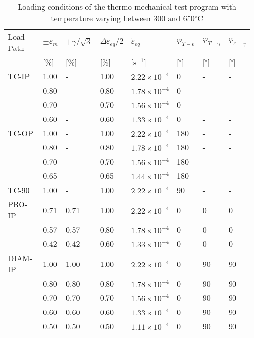 \documentclass[preprint,5p,twocolumn,11pt,sort&compress]{elsarticle}
\begin{document}
\begin{table*}[htbp]
  \centering
  \caption{Loading conditions of the thermo-mechanical test program with temperature varying between 300 and 650$^\circ$C} \vspace{0.1cm}
    \begin{tabular}{p{2cm}p{1.5cm}p{1.5cm}p{1.5cm}p{2.5cm}p{1cm}p{1cm}p{1cm}}
    \hline
    Load Path & $\pm \varepsilon _m$ & $\pm \gamma/ \sqrt 3$ & $\Delta\varepsilon _{eq}/2$ & $\dot \varepsilon _{eq}$ & $\varphi_{T-\varepsilon}$ & $\varphi_{T-\gamma}$ & $\varphi_{\varepsilon-\gamma}$ \\
          & [\%]  & [\%]  & [\%]  & [s$^{-1}$] & [$^\circ$] & [$^\circ$] & [$^\circ$]  \\
    \hline
    TC-IP & 1.00  & -     & 1.00  & $2.22\times 10^{-4}$ & 0     & -     & -   \\
          & 0.80  & -     & 0.80  & $1.78\times 10^{-4}$ & 0     & -     & -    \\
          & 0.70  & -     & 0.70  & $1.56\times 10^{-4}$ & 0     & -     & -    \\
          & 0.60  & -     & 0.60  & $1.33\times 10^{-4}$ & 0     & -     & -     \\
    \hline
    TC-OP & 1.00  & -     & 1.00  & $2.22\times 10^{-4}$ & 180   & -     & -    \\
          & 0.80  & -     & 0.80  & $1.78\times 10^{-4}$ & 180   & -     & -    \\
          & 0.70  & -     & 0.70  & $1.56\times 10^{-4}$ & 180   & -     & -    \\
          & 0.65  & -     & 0.65  & $1.44\times 10^{-4}$ & 180   & -     & -    \\
    \hline
    TC-90 & 1.00  & -     & 1.00  & $2.22\times 10^{-4}$ & 90    & -     & -    \\
    \hline
    PRO-IP & 0.71  & 0.71  & 1.00  & $2.22\times 10^{-4}$ & 0     & 0     & 0    \\
          & 0.57  & 0.57  & 0.80  & $1.78\times 10^{-4}$ & 0     & 0     & 0    \\
          & 0.42  & 0.42  & 0.60  & $1.33\times 10^{-4}$ & 0     & 0     & 0     \\
    \hline
    DIAM-IP & 1.00  & 1.00  & 1.00  & $2.22\times 10^{-4}$ & 0     & 90    & 90  \\
          & 0.80  & 0.80  & 0.80  & $1.78\times 10^{-4}$ & 0     & 90    & 90  \\
          & 0.70  & 0.70  & 0.70  & $1.56\times 10^{-4}$ & 0     & 90    & 90   \\
          & 0.60  & 0.60  & 0.60  & $1.33\times 10^{-4}$ & 0     & 90    & 90   \\
          & 0.50  & 0.50  & 0.50  & $1.11\times 10^{-4}$ & 0     & 90    & 90    \\
    \hline
    \end{tabular}%
  \label{tab:Loading-Conditions-TMF}%
\end{table*}%
\end{document}
